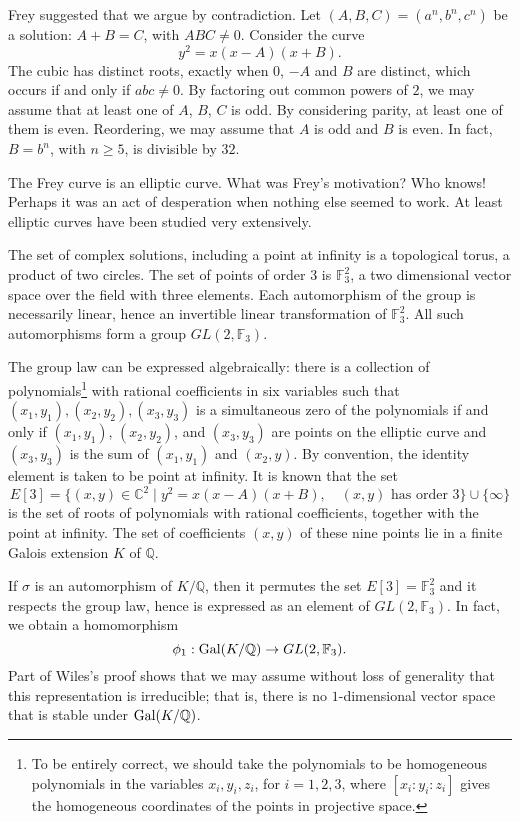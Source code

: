 \documentclass{llncs}
\def\op#1{{\hbox{#1}}}
\newcommand{\ring}[1]{\mathbb{#1}}
\begin{document}
Frey suggested that we argue by contradiction.  Let
$(A,B,C)=(a^n,b^n,c^n)$ be a solution: $A+B=C$, with $ABC\ne
0$. Consider the curve
\[
y^2 = x (x - A) (x + B).
\]
The cubic has distinct roots, exactly when $0$, $-A$ and $B$ are
distinct, which occurs if and only if $abc\ne 0$.  By factoring out
common powers of $2$, we may assume that at least one of $A$, $B$, $C$
is odd.  By considering parity, at least one of them is even.
Reordering, we may assume that $A$ is odd and $B$ is even.  In fact,
$B=b^n$, with $n\ge 5$, is divisible by $32$.


The Frey curve is an elliptic curve.  What was Frey's motivation?  Who
knows! Perhaps it was an act of desperation when nothing else seemed
to work. At least elliptic curves have been studied very extensively.

The set of complex solutions, including a point at infinity is a
topological torus, a product of two circles.  The set of points of
order $3$ is $\ring{F}_3^2$, a two dimensional vector space over the
field with three elements.  Each automorphism of the group is
necessarily linear, hence an invertible linear transformation of
$\ring{F}^2_3$.  All such automorphisms form a group
$GL(2,\ring{F}_3)$.

The group law can be expressed algebraically: there is a collection of
polynomials\footnote{To be entirely correct, we should take the
  polynomials to be homogeneous polynomials in the variables
  $x_i,y_i,z_i$, for $i=1,2,3$, where $[x_i:y_i:z_i]$ gives the
  homogeneous coordinates of the points in projective space.}  with
rational coefficients in six variables such that
$(x_1,y_1),(x_2,y_2),(x_3,y_3)$ is a simultaneous zero of the
polynomials if and only if $(x_1,y_1)$, $(x_2,y_2)$, and $(x_3,y_3)$
are points on the elliptic curve and $(x_3,y_3)$ is the sum of
$(x_1,y_1)$ and $(x_2,y)$.  By convention, the identity element is
taken to be point at infinity.  It is known that the set
\[
E[3]= \{(x,y) \in \ring{C}^2\mid y^2 = x (x-A) (x+B), 
\quad (x,y) \text{ has order } 3\}\cup \{\infty\}
\]
is the set of roots of polynomials with rational coefficients,
together with the point at infinity.  The set of coefficients $(x,y)$
of these nine points lie in a finite Galois extension $K$ of
$\ring{Q}$.

If $\sigma$ is an automorphism of $K/\ring{Q}$, then it permutes the
set $E[3]=\ring{F}_3^2$ and it respects the group law, hence is
expressed as an element of $GL(2,\ring{F}_3)$.  In fact, we obtain a
homomorphism
\[
\phi_1 : \op{Gal}(K/\ring{Q}) \to GL(2,\ring{F}_3).
\]
Part of Wiles's proof shows that we may assume without loss of
generality that this representation is irreducible; that is, there is
no $1$-dimensional vector space that is stable under
$\op{Gal}(K/\ring{Q})$.
\end{document}
